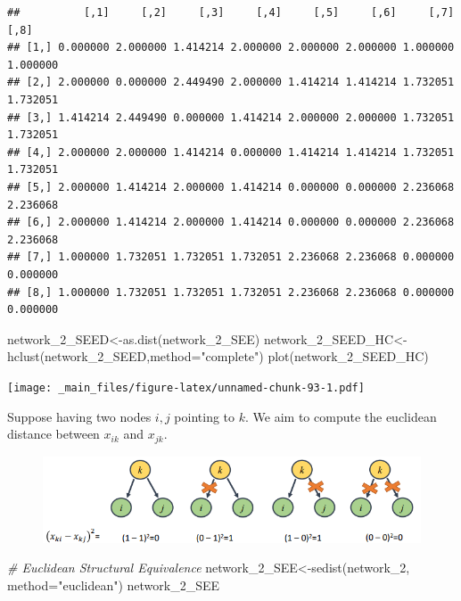 \documentclass[
  notitlepage,
  onecolumn,
  openany]{book}
\newenvironment{Shaded}{\begin{snugshade}}{\end{snugshade}}
\newcommand{\AttributeTok}[1]{\textcolor[rgb]{0.77,0.63,0.00}{#1}}
\newcommand{\CommentTok}[1]{\textcolor[rgb]{0.56,0.35,0.01}{\textit{#1}}}
\newcommand{\FunctionTok}[1]{\textcolor[rgb]{0.00,0.00,0.00}{#1}}
\newcommand{\NormalTok}[1]{#1}
\newcommand{\OtherTok}[1]{\textcolor[rgb]{0.56,0.35,0.01}{#1}}
\newcommand{\StringTok}[1]{\textcolor[rgb]{0.31,0.60,0.02}{#1}}
\begin{document}
\begin{verbatim}
##          [,1]     [,2]     [,3]     [,4]     [,5]     [,6]     [,7]     [,8]
## [1,] 0.000000 2.000000 1.414214 2.000000 2.000000 2.000000 1.000000 1.000000
## [2,] 2.000000 0.000000 2.449490 2.000000 1.414214 1.414214 1.732051 1.732051
## [3,] 1.414214 2.449490 0.000000 1.414214 2.000000 2.000000 1.732051 1.732051
## [4,] 2.000000 2.000000 1.414214 0.000000 1.414214 1.414214 1.732051 1.732051
## [5,] 2.000000 1.414214 2.000000 1.414214 0.000000 0.000000 2.236068 2.236068
## [6,] 2.000000 1.414214 2.000000 1.414214 0.000000 0.000000 2.236068 2.236068
## [7,] 1.000000 1.732051 1.732051 1.732051 2.236068 2.236068 0.000000 0.000000
## [8,] 1.000000 1.732051 1.732051 1.732051 2.236068 2.236068 0.000000 0.000000
\end{verbatim}

\begin{Shaded}
\begin{Highlighting}[]
\NormalTok{network\_2\_SEED}\OtherTok{\textless{}{-}}\FunctionTok{as.dist}\NormalTok{(network\_2\_SEE)}
\NormalTok{network\_2\_SEED\_HC}\OtherTok{\textless{}{-}}\FunctionTok{hclust}\NormalTok{(network\_2\_SEED,}\AttributeTok{method=}\StringTok{"complete"}\NormalTok{)}
\FunctionTok{plot}\NormalTok{(network\_2\_SEED\_HC)}
\end{Highlighting}
\end{Shaded}

\texttt{[image: \_main\_files/figure-latex/unnamed-chunk-93-1.pdf]}

Suppose having two nodes \(i,j\) pointing to \(k\). We aim to compute the euclidean distance between \(x_{ik}\) and \(x_{jk}\).

\begin{figure}[h!]

{\centering \includegraphics[width=0.8\linewidth]{images/11-Subgroups and Structural Equivalence/Untitled 9} 

}

\end{figure}

\begin{Shaded}
\begin{Highlighting}[]
\CommentTok{\# Euclidean Structural Equivalence}
\NormalTok{network\_2\_SEE}\OtherTok{\textless{}{-}}\FunctionTok{sedist}\NormalTok{(network\_2, }\AttributeTok{method=}\StringTok{"euclidean"}\NormalTok{)}
\NormalTok{network\_2\_SEE}
\end{Highlighting}
\end{Shaded}
\end{document}
